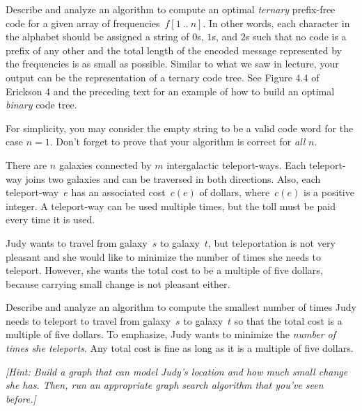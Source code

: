 \documentclass[11pt]{article}
\begin{document}
\begin{problems}
\item
  Describe and analyze an algorithm to compute an optimal \emph{ternary} prefix-free code for a
  given array of frequencies~\(f[1~..~n]\).
  In other words, each character in the alphabet should be assigned a string of \(0\)s, \(1\)s, and
  \(2\)s such that no code is a prefix of any other and the total length of the encoded message
  represented by the frequencies is as small as possible.
  Similar to what we saw in lecture, your output can be the representation of a ternary code tree.
  See Figure 4.4 of Erickson 4 and the preceding text for an example of how to build an optimal
  \emph{binary} code tree.

  For simplicity, you may consider the empty string to be a valid code word for the case \(n = 1\).
  Don't forget to prove that your algorithm is correct for \emph{all} \(n\).

\item
  There are \(n\) galaxies connected by \(m\) intergalactic teleport-ways.
  Each teleport-way joins two galaxies and can be traversed in both directions.
  Also, each teleport-way~\(e\) has an associated cost~\(c(e)\) of dollars, where~\(c(e)\) is a
  positive integer.
  A teleport-way can be used multiple times, but the toll must be paid every time it is used.

  Judy wants to travel from galaxy~\(s\) to galaxy~\(t\), but teleportation is not very pleasant and
  she would like to minimize the number of times she needs to teleport.
  However, she wants the total cost to be a multiple of five dollars, because carrying small change
  is not pleasant either.

  Describe and analyze an algorithm to compute the smallest number of times Judy needs to teleport
  to travel from galaxy~\(s\) to galaxy~\(t\) so that the total cost is a multiple of five dollars.
  To emphasize, Judy wants to minimize the \emph{number of times she teleports}.
  Any total cost is fine as long as it is a multiple of five dollars.
  
  \emph{[Hint: Build a graph that can model Judy's location and how much small change she has.
  Then, run an appropriate graph search algorithm that you've seen before.]}
\end{problems}
\end{document}
